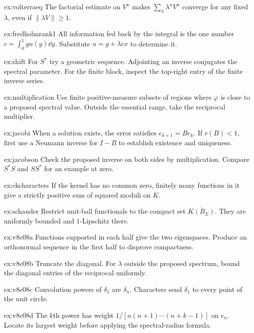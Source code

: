 \begin{hint}{ex:volterraeq}
The factorial estimate on $V^n$ makes $\sum_n\lambda^nV^n$ converge for any fixed $\lambda$, even if $\|\lambda V\|\ge1$.
\end{hint}
\begin{hint}{ex:fredholmrank1}
All information fed back by the integral is the one number $c=\int_0^1yu(y)\dd y$. Substitute $u=g+\lambda cx$ to determine it.
\end{hint}
\begin{hint}{ex:shift}
For $S^*$ try a geometric sequence. Adjointing an inverse conjugates the spectral parameter. For the finite block, inspect the top-right entry of the finite inverse series.
\end{hint}
\begin{hint}{ex:multiplication}
Use finite positive-measure subsets of regions where $\varphi$ is close to a proposed spectral value. Outside the essential range, take the reciprocal multiplier.
\end{hint}
\begin{hint}{ex:jacobi}
When a solution exists, the error satisfies $e_{k+1}=Be_k$. If $r(B)<1$, first use a Neumann inverse for $I-B$ to establish existence and uniqueness.
\end{hint}
\begin{hint}{ex:jacobson}
Check the proposed inverse on both sides by multiplication. Compare $S^*S$ and $SS^*$ for an example at zero.
\end{hint}
\begin{hint}{ex:ckcharacters}
If the kernel has no common zero, finitely many functions in it give a strictly positive sum of squared moduli on $K$.
\end{hint}
\begin{hint}{ex:schauder}
Restrict unit-ball functionals to the compact set $\overline{K(B_E)}$. They are uniformly bounded and $1$-Lipschitz there.
\end{hint}
\begin{hint}{ex:v8c08a}
Functions supported in each half give the two eigenspaces. Produce an orthonormal sequence in the first half to disprove compactness.
\end{hint}
\begin{hint}{ex:v8c08b}
Truncate the diagonal. For $\lambda$ outside the proposed spectrum, bound the diagonal entries of the reciprocal uniformly.
\end{hint}
\begin{hint}{ex:v8c08c}
Convolution powers of $\delta_1$ are $\delta_n$. Characters send $\delta_1$ to every point of the unit circle.
\end{hint}
\begin{hint}{ex:v8c08d}
The $k$th power has weight $1/[n(n+1)\cdots(n+k-1)]$ on $e_n$. Locate its largest weight before applying the spectral-radius formula.
\end{hint}

